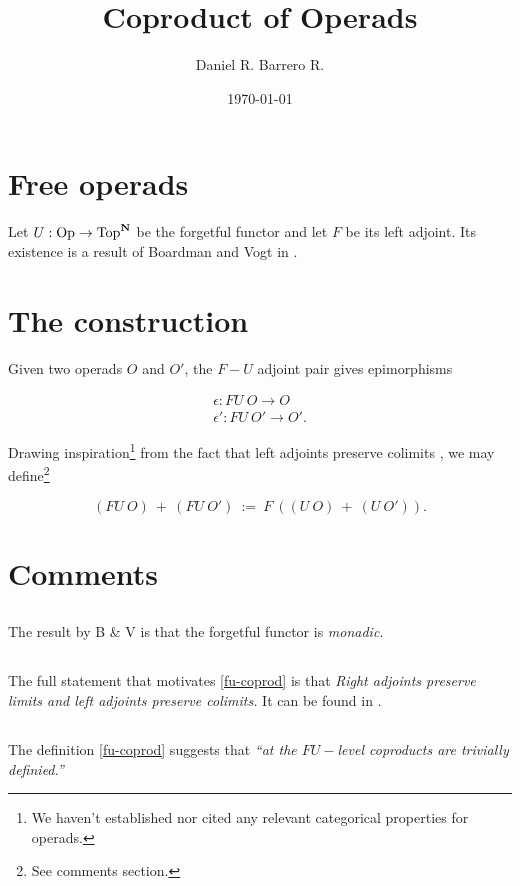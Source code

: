 \documentclass{amsart}
\title{Coproduct of Operads}
\author{Daniel R. Barrero R.}
\date{\today}
\begin{document}
\maketitle

\section{Free operads}

Let $U : \mathrm{Op} \to \mathrm{Top}^{\mathbf{N}}$ be the forgetful functor and let $F$ be its
left adjoint. Its existence is a result of Boardman and Vogt in \cite{bv-hiasots}.

\section{The construction}

Given two operads $O$ and $O'$, the $F-U$ adjoint pair gives epimorphisms 

\begin{eqnarray}\label{fu-epis}
	\epsilon : FU \ O \to O \\
	\epsilon' : FU \ O' \to O'.
\end{eqnarray}


Drawing inspiration\footnote{We haven't established nor cited any relevant
categorical properties for operads.} from the fact that left adjoints
preserve colimits \cite{riehl-ctic}, we may define\footnote{See comments
section.}


\begin{equation}\label{fu-coprod}
	(FU \ O) \ + \ (FU \ O') \ := \ F \ \left( (U \ O) \ + \ (U \ O')
	\right).
\end{equation}



\section{Comments}

\subsection{} The result by B \& V is that the forgetful functor is \emph{monadic.}

\subsection{} The full statement that motivates \eqref{fu-coprod} is that
\emph{Right adjoints preserve limits and left adjoints preserve colimits.}
It can be found in \cite{riehl-ctic}.





\subsection{} The definition \eqref{fu-coprod} suggests that
\emph{``at the $FU-$level coproducts are trivially definied.''}
\end{document}
